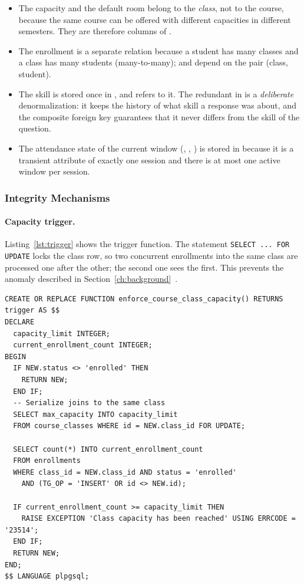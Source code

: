 \begin{itemize}
    \item The capacity and the default room belong to the \emph{class}, not to the course, because the same course can be offered with different capacities in different semesters. They are therefore columns of .
    \item The enrollment is a separate relation because a student has many classes and a class has many students (many-to-many);  and  depend on the pair (class, student).
    \item The skill is stored once in , and  refers to it. The redundant  in  is a \emph{deliberate} denormalization: it keeps the history of what skill a response was about, and the composite foreign key guarantees that it never differs from the skill of the question.
    \item The attendance state of the current window (, , ) is stored in  because it is a transient attribute of exactly one session and there is at most one active window per session.
\end{itemize}

\subsubsection{Integrity Mechanisms}

\paragraph{Capacity trigger.} Listing~\ref{lst:trigger} shows the trigger function. The statement \texttt{SELECT ... FOR UPDATE} locks the class row, so two concurrent enrollments into the same class are processed one after the other; the second one sees the first. This prevents the anomaly described in Section~\ref{ch:background}~\cite{berenson1995critique, bernstein1981concurrency, postgresdocs}.

\begin{lstlisting}[language=SQLpg, caption={Capacity enforcement trigger (excerpt of \texttt{schema.sql})}, label={lst:trigger}]
CREATE OR REPLACE FUNCTION enforce_course_class_capacity() RETURNS trigger AS $$
DECLARE
  capacity_limit INTEGER;
  current_enrollment_count INTEGER;
BEGIN
  IF NEW.status <> 'enrolled' THEN
    RETURN NEW;
  END IF;
  -- Serialize joins to the same class
  SELECT max_capacity INTO capacity_limit
  FROM course_classes WHERE id = NEW.class_id FOR UPDATE;

  SELECT count(*) INTO current_enrollment_count
  FROM enrollments
  WHERE class_id = NEW.class_id AND status = 'enrolled'
    AND (TG_OP = 'INSERT' OR id <> NEW.id);

  IF current_enrollment_count >= capacity_limit THEN
    RAISE EXCEPTION 'Class capacity has been reached' USING ERRCODE = '23514';
  END IF;
  RETURN NEW;
END;
$$ LANGUAGE plpgsql;
\end{lstlisting}

